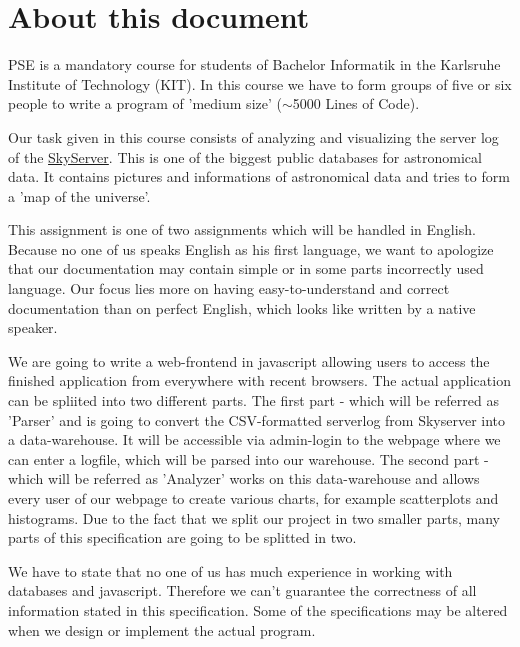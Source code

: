 \section*{About this document}

PSE is a mandatory course for students of Bachelor Informatik in the 
Karlsruhe Institute of Technology (KIT). 
In this course we have to form groups of five or six people to write
 a program of 'medium size' ($\sim$5000 Lines of Code).

Our task given in this course consists of
analyzing and visualizing the server log of the 
\href{http://skyserver.sdss.org/public/en/}{SkyServer}.
This is one of the biggest public databases for astronomical data. 
It contains pictures and informations of astronomical data
and tries to form a 'map of the universe'.

This assignment is one of two assignments which will be handled 
in English.
Because no one of us speaks English as his first language, 
we want to apologize that our documentation may contain simple 
or in some parts incorrectly used language. Our focus lies more on 
having easy-to-understand and correct documentation 
than on perfect English, which looks like written by a native speaker.

We are going to write a web-frontend in javascript allowing users 
to access the finished application from everywhere
with recent browsers. The actual application can be spliited into two 
different parts. The first part - which will be referred as 'Parser' and is going to convert the CSV-formatted 
serverlog from Skyserver into a data-warehouse. It will
be accessible via admin-login to the webpage where we can enter a 
logfile, which will be parsed into our warehouse.
The second part - which will be referred as 'Analyzer' works on this data-warehouse 
and allows every user of our webpage to create various charts, 
for example scatterplots and histograms.
Due to the fact that we split our project in two smaller parts, 
many parts of this specification are going to be splitted in two.

We have to state that no one of us has much experience in working 
with databases and javascript.
Therefore we can't guarantee the correctness of all information 
stated in this specification. Some of the specifications may be altered when we design or 
implement the actual program.
